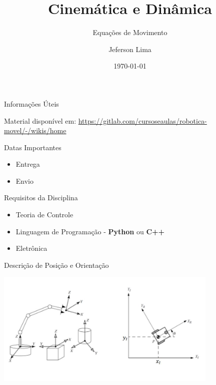 \documentclass{beamer}
\title{Cinemática e Dinâmica}
\subtitle{Equações de Movimento}
\date{\today}
\author{Jeferson Lima}
\institute{\url{http://gitlab.com/jeferson.lima}}
\newcommand{\pausar}{\pause}
\begin{document}
\maketitle

\begin{frame}{Informações Úteis}
	\begin{block}{Material disponível em:}
		\href{Robótica Móvel - Wiki}{https://gitlab.com/cursoseaulas/robotica-movel/-/wikis/home}
	\end{block}
	\pausar
	\begin{block}{Datas Importantes}
		\begin{itemize}
		\item Entrega
		\item Envio
		\end{itemize}
	\end{block}
	\pausar
	\begin{block}{Requisitos da Disciplina}
		\begin{itemize}
		\item Teoria de Controle
		\item Linguagem de Programação - \textbf{Python} ou \textbf{C++}
		\item Eletrônica
		\end{itemize}
	\end{block}
\end{frame}

\begin{frame}{Descrição de Posição e Orientação}
\begin{center}
    \includegraphics[width=0.8\textwidth]{images/mecanismos.jpg}
\end{center}
\end{frame}
\end{document}
